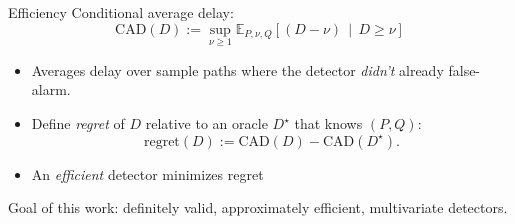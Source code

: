 \documentclass[10pt,aspectratio=169]{beamer}
\newcommand{\E}{\mathbb{E}}
\newcommand{\Prob}{\mathbb{P}}
\newcommand{\Mt}{M_{t}}
\newcommand{\TSM}{\textsc{tsm}}
\newcommand{\CAD}{\ensuremath{\mathrm{CAD}}}
\newcommand{\Pc}{\mathcal{P}}
\newcommand{\Qc}{\mathcal{Q}}
\newcommand{\Hc}{\mathcal{H}}
\newcommand{\Fc}{\mathcal{F}}
\begin{document}
\begin{frame}{Efficiency}
Conditional average delay:
  $$
\displaystyle
      \CAD(D) := \sup_{\nu\ge 1}\E_{P,\nu,Q}\!\left[(D - \nu) \,\middle|\, D \ge \nu\right]$$
  \begin{itemize}
    \item Averages delay over sample paths where the detector \emph{didn't} already false-alarm.
    \item Define \emph{regret} of $D$ relative to an oracle $D^\star$ that knows $(P,Q)$:
    \[
      \mathrm{regret}(D) := \CAD(D) - \CAD(D^\star).
    \]
    \item An \textit{efficient} detector minimizes regret
  \end{itemize}
  \medskip
  \alert{Goal of this work:} definitely valid, approximately efficient, multivariate detectors.
\end{frame}


\end{document}
